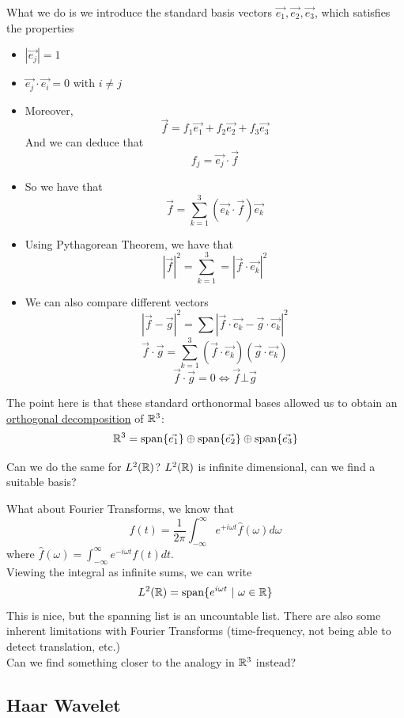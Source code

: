 \documentclass{article}
\begin{document}
What we do is we introduce the standard basis vectors $\Vec{e_1}, \Vec{e_2}, \Vec{e_3}$, which satisfies the properties
\begin{itemize}
    \item $|\Vec{e_j}| = 1$
    \item $\Vec{e_j} \cdot \Vec{e_i} = 0$ with $i \neq j$
    \item Moreover,
    \[\Vec{f} = f_1 \Vec{e_1} + f_2 \Vec{e_2} + f_3 \Vec{e_3}\]
    And we can deduce that
    \[f_j = \Vec{e_j} \cdot \Vec{f}\]
    \item So we have that
    \[\Vec{f} = \sum_{k = 1}^3 (\Vec{e_k} \cdot \Vec{f}) \Vec{e_k}\]
    \item Using Pythagorean Theorem, we have that
    \[|\Vec{f}|^2 = \sum_{k = 1}^3 = |\Vec{f} \cdot \Vec{e_k}|^2 \]
    \item We can also compare different vectors
    \[|\Vec{f} - \Vec{g}|^2 = \sum |\Vec{f} \cdot \Vec{e_k}  - \Vec{g} \cdot \Vec{e_k}|^2\]
    \[\Vec{f} \cdot \Vec{g} = \sum_{k=1}^3 (\Vec{f} \cdot \Vec{e_k})(\Vec{g} \cdot \Vec{e_k})\]
    \[\Vec{f} \cdot \Vec{g} = 0 \iff \Vec{f} \bot \Vec{g}\]
\end{itemize}
The point here is that these standard orthonormal bases allowed us to obtain an \ul{orthogonal decomposition} of $\mathbb{R}^3$:
\[\mathbb{R}^3 = \operatorname{span} \{\Vec{e_1}\} \oplus \operatorname{span} \{\Vec{e_2}\} \oplus \operatorname{span} \{\Vec{e_3}\}\]

\begin{question}
    Can we do the same for $L^2(\mathbb{R})$? $L^2(\mathbb{R})$ is infinite dimensional, can we find a suitable basis?
\end{question}

What about Fourier Transforms, we know that
\[f(t) = \frac{1}{2\pi} \int_{-\infty}^\infty e^{+i\omega t} \widehat{f}(\omega) d\omega\]
where $\widehat{f}(\omega) = \int_{-\infty}^\infty e^{-i\omega t} f(t) dt$.\\

Viewing the integral as infinite sums, we can write
\[L^2(\mathbb{R}) = \operatorname{span} \{e^{i\omega t}\ |\ \omega \in \mathbb{R}\}\]
This is nice, but the spanning list is an uncountable list. There are also some inherent limitations with Fourier Transforms (time-frequency, not being able to detect translation, etc.)\\

Can we find something closer to the analogy in $\mathbb{R}^3$ instead?

\subsection{Haar Wavelet}
\end{document}
